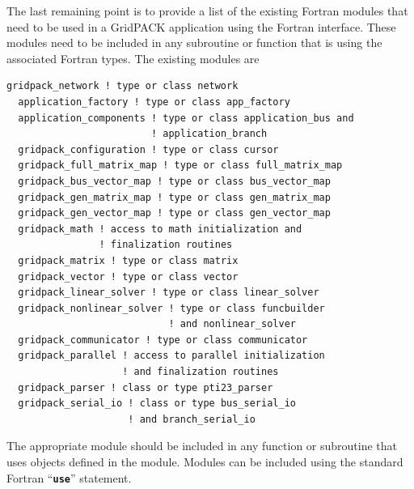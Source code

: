 The last remaining point is to provide a list of the existing Fortran modules that need to be used in a GridPACK application using the Fortran interface. These modules need to be included in any subroutine or function that is using the associated Fortran types. The existing modules are

{
\color{red}
\begin{Verbatim}[fontseries=b]
  gridpack_network ! type or class network
  application_factory ! type or class app_factory
  application_components ! type or class application_bus and
                         ! application_branch
  gridpack_configuration ! type or class cursor
  gridpack_full_matrix_map ! type or class full_matrix_map
  gridpack_bus_vector_map ! type or class bus_vector_map
  gridpack_gen_matrix_map ! type or class gen_matrix_map
  gridpack_gen_vector_map ! type or class gen_vector_map
  gridpack_math ! access to math initialization and
                ! finalization routines
  gridpack_matrix ! type or class matrix
  gridpack_vector ! type or class vector
  gridpack_linear_solver ! type or class linear_solver
  gridpack_nonlinear_solver ! type or class funcbuilder
                            ! and nonlinear_solver
  gridpack_communicator ! type or class communicator
  gridpack_parallel ! access to parallel initialization
                    ! and finalization routines
  gridpack_parser ! class or type pti23_parser
  gridpack_serial_io ! class or type bus_serial_io
                     ! and branch_serial_io
\end{Verbatim}
}

The appropriate module should be included in any function or subroutine that uses objects defined in the module. Modules can be included using the standard Fortran ``\texttt{\textbf{use}}'' statement.
\newline
\hyperlink{topDoc}{\color{blue}{Top}}
